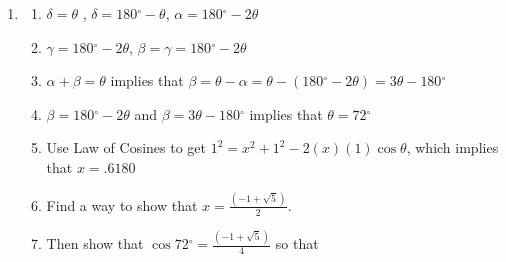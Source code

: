 \documentclass[english]{book}
\makeatletter
\def\overlay#1#2{\mathpalette\@overlay{{#1}{#2}{\hfil}{\hfil}}}
\def\@overlay#1#2{\@@overlay#1#2}
\def\@@overlay#1#2#3#4#5{{
   \def\overlaystyle{#1}
   \setbox0=\hbox{\m@th$\overlaystyle#2$}
   \setbox1=\hbox{\m@th$\overlaystyle#3$}
   \ifdim \wd0<\wd1 \setbox2=\box1 \setbox1=\box0 \setbox0=\box2\fi
   \rlap{\hbox to\wd0{#4\box1\relax#5}}\box0
}}
\newcommand{\angm}{\overlay{<}{)} }
\newcommand{\degrees}{\ensuremath{^{\circ}}}
\makeatother
\begin{document}
\begin{enumerate}
\begin{enumerate}[\hspace{1cm}a)]
                               $= PR \sin (m \angm P) \cos (90 \degrees - (m \angm P) ) = 67.9184$
                         \end{enumerate}
  \item[\hspace{1cm}31)] \begin{enumerate}[\hspace{1cm}a)]
                           \item $\delta = \theta$ , $\delta = 180 \degrees - \theta$, $\alpha = 180 \degrees - 2 \theta$
                           \item $\gamma = 180 \degrees - 2 \theta$, $\beta = \gamma = 180 \degrees - 2 \theta$
                           \item $\alpha + \beta = \theta$ implies that $\beta = \theta - \alpha = \theta -(180 \degrees - 2 \theta) = 3 \theta - 180 \degrees$
                           \item $\beta = 180 \degrees - 2 \theta$ and $\beta = 3 \theta - 180 \degrees$ implies that $\theta = 72 \degrees$
                           \item Use Law of Cosines to get $1^{2} = x^{2} + 1^{2} -2(x)(1) \cos \theta$, which implies that $x = .6180$
                           \item Find a way to show that $x = \frac{(-1 + \sqrt{5})}{2}$.
                           \item Then show that $\cos 72 \degrees = \frac{ (-1 + \sqrt{5}) }{4}$ so that 


\end{enumerate}
\end{enumerate}
\end{document}
